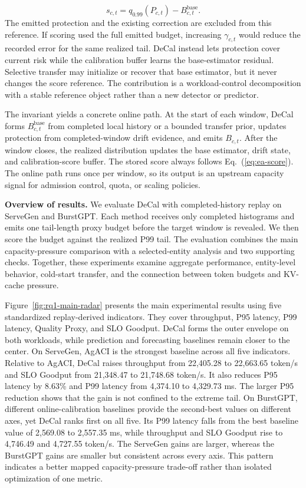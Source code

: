 \documentclass[sigplan,10pt, anonymous]{acmart}
\begin{document}
\begin{equation}
\label{eq:ea-score}
s_{c,t}=q_{0.99}(P_{c,t})-B^{\mathrm{base}}_{c,t}.
\end{equation}
The emitted protection and the existing correction are excluded from this reference. If scoring used the full emitted budget, increasing $\gamma_{c,t}$ would reduce the recorded error for the same realized tail. DeCal instead lets protection cover current risk while the calibration buffer learns the base-estimator residual. Selective transfer may initialize or recover that base estimator, but it never changes the score reference. The contribution is a workload-control decomposition with a stable reference object rather than a new detector or predictor.

The invariant yields a concrete online path. At the start of each window, DeCal forms $B^{\mathrm{base}}_{c,t}$ from completed local history or a bounded transfer prior, updates protection from completed-window drift evidence, and emits $B_{c,t}$. After the window closes, the realized distribution updates the base estimator, drift state, and calibration-score buffer. The stored score always follows Eq.~(\ref{eq:ea-score}). The online path runs once per window, so its output is an upstream capacity signal for admission control, quota, or scaling policies.

\noindent\textbf{Overview of results.}
We evaluate DeCal with completed-history replay on ServeGen and BurstGPT. Each method receives only completed histograms and emits one tail-length proxy budget before the target window is revealed. We then score the budget against the realized P99 tail. The evaluation combines the main capacity-pressure comparison with a selected-entity analysis and two supporting checks. Together, these experiments examine aggregate performance, entity-level behavior, cold-start transfer, and the connection between token budgets and KV-cache pressure.

Figure~\ref{fig:rq1-main-radar} presents the main experimental results using five standardized replay-derived indicators. They cover throughput, P95 latency, P99 latency, Quality Proxy, and SLO Goodput. DeCal forms the outer envelope on both workloads, while prediction and forecasting baselines remain closer to the center. On ServeGen, AgACI is the strongest baseline across all five indicators. Relative to AgACI, DeCal raises throughput from 22,405.28 to 22,663.65 token/s and SLO Goodput from 21,348.47 to 21,748.68 token/s. It also reduces P95 latency by 8.63\% and P99 latency from 4,374.10 to 4,329.73 ms. The larger P95 reduction shows that the gain is not confined to the extreme tail. On BurstGPT, different online-calibration baselines provide the second-best values on different axes, yet DeCal ranks first on all five. Its P99 latency falls from the best baseline value of 2,569.08 to 2,557.35 ms, while throughput and SLO Goodput rise to 4,746.49 and 4,727.55 token/s. The ServeGen gains are larger, whereas the BurstGPT gains are smaller but consistent across every axis. This pattern indicates a better mapped capacity-pressure trade-off rather than isolated optimization of one metric. 
\end{document}
